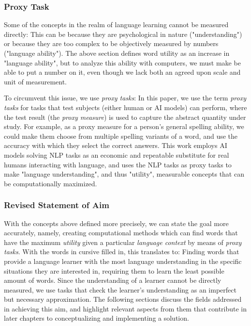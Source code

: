 \subsubsection{Proxy Task}
Some of the concepts in the realm of language learning cannot be measured directly:
This can be because they are psychological in nature ("understanding") or because they are too complex to be objectively measured by numbers ("language ability").
The above section defines word utility as an increase in "language ability", but to analyze this ability with computers, we must make be able to put a number on it, even though we lack both an agreed upon scale and unit of measurement.

To circumvent this issue, we use \textit{proxy tasks}:
In this paper, we use the term \textit{proxy tasks} for tasks that test subjects (either human or AI models) can perform, where the test result (the \textit{proxy measure}) is used to capture the abstract quantity under study.
For example, as a proxy measure for a person's general spelling ability, we could make them choose from multiple spelling variants of a word, and use the accuracy with which they select the correct answers.
This work employs AI models solving NLP tasks as an economic and repeatable substitute for real humans interacting with language, and uses the NLP tasks as proxy tasks to make "language understanding", and thus "utility", measurable concepts that can be computationally maximized.

\subsubsection{Revised Statement of Aim}
With the concepts above defined more precisely, we can state the goal more accurately, namely, creating computational methods which can find words that have the maximum \textit{utility} given a particular \textit{language context} by means of \textit{proxy tasks}.
With the words in cursive filled in, this translates to:
Finding words that provide a language learner with the most language understanding in the specific situations they are interested in, requiring them to learn the least possible amount of words.
Since the understanding of a learner cannot be directly measured, we use tasks that check the learner's understanding as an imperfect but necessary approximation.
The following sections discuss the fields addressed in achieving this aim, and highlight relevant aspects from them that contribute in later chapters to conceptualizing and implementing a solution.


